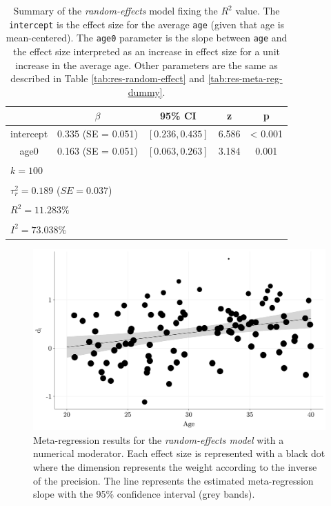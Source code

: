 \documentclass[
  man,floatsintext]{apa6}
\begin{document}
\normalsize

\scriptsize

\begin{table}[H]

\caption{\label{tab:res-meta-reg-numerical-r2}Summary of the \emph{random-effects} model fixing the \(R^{2}\) value. The \texttt{intercept} is the effect size for the average \texttt{age} (given that age is mean-centered). The \texttt{age0} parameter is the slope between \texttt{age} and the effect size interpreted as an increase in effect size for a unit increase in the average age. Other parameters are the same as described in Table \ref{tab:res-random-effect} and \ref{tab:res-meta-reg-dummy}.}
\centering
\fontsize{9}{11}\selectfont
\begin{tabular}[t]{ccccc}
\toprule
 & $\beta$ & 95\% CI & z & p\\
\midrule
intercept & 0.335 (SE = 0.051) & $[0.236, 0.435]$ & 6.586 & < 0.001\\
age0 & 0.163 (SE = 0.051) & $[0.063, 0.263]$ & 3.184 & 0.001\\
\bottomrule
\multicolumn{5}{l}{\textsuperscript{} $k = 100$}\\
\multicolumn{5}{l}{\textsuperscript{} $\tau^2_r = 0.189$ ($SE = 0.037$)}\\
\multicolumn{5}{l}{\textsuperscript{} $R^2 = 11.283\%$}\\
\multicolumn{5}{l}{\textsuperscript{} $I^2 = 73.038\%$}\\
\end{tabular}
\end{table}

\normalsize

\scriptsize

\begin{figure}[H]

{\centering \includegraphics[width=0.8\linewidth]{paper_files/figure-latex/plot-meta-reg-numerical-r2-1} 

}

\caption{Meta-regression results for the \emph{random-effects model} with a numerical moderator. Each effect size is represented with a black dot where the dimension represents the weight according to the inverse of the precision. The line represents the estimated meta-regression slope with the 95\% confidence interval (grey bands).}\label{fig:plot-meta-reg-numerical-r2}
\end{figure}
\end{document}
